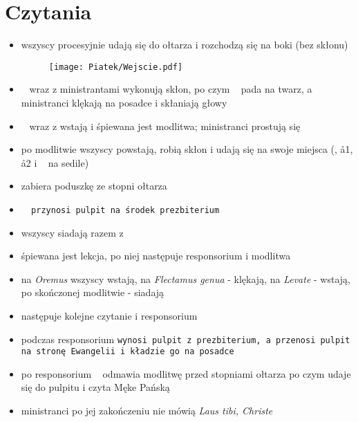 \section{Czytania}

    \begin{itemize}
        \item wszyscy procesyjnie udają się do ołtarza i rozchodzą się na boki (bez skłonu)
        
        \begin{figure}[h]
        	\centering
            \texttt{[image: Piatek/Wejscie.pdf]}
        \end{figure}
        
        \item \ii~ wraz z ministrantami wykonują skłon, po czym \ii~ pada na twarz, a ministranci klękają na posadce i skłaniają głowy
        \item \ii~ wraz z  wstają i śpiewana jest modlitwa; ministranci prostują się
        \item po modlitwie wszyscy powstają, robią skłon i udają się na swoje miejsca (\ii, \aa1, \aa2 i \cc~ na sedile)
        \item {} zabiera poduszkę ze stopni ołtarza
        \item \tt~ przynosi pulpit na środek prezbiterium 
        \item wszyscy siadają razem z \ii
        \item śpiewana jest lekcja, po niej następuje responsorium i modlitwa
        \item na \textit{Oremus} wszyscy wstają, na \textit{Flectamus genua} - klękają, na \textit{Levate} - wstają, po skończonej modlitwie - siadają
        \item następuje kolejne czytanie i responsorium
        \item podczas responsorium \tt wynosi pulpit z prezbiterium, a  przenosi pulpit na stronę Ewangelii i kładzie go na posadce
        \item po responsorium \ii~ odmawia modlitwę przed stopniami ołtarza po czym udaje się do pulpitu i czyta Męke Pańską
        \item ministranci po jej zakończeniu nie mówią \textit{Laus tibi, Christe}
    \end{itemize}